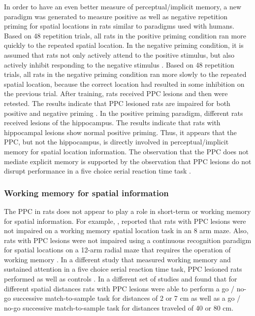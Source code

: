 \documentclass[doc, longtable]{apa6}
\begin{document}
In order to have an even better measure of perceptual/implicit memory, a new paradigm was generated to measure positive as well as negative repetition priming for spatial locations in rats similar to paradigms used with humans. Based on 48 repetition trials, all rats in the positive priming condition ran more quickly to the repeated spatial location. In the negative priming condition, it is assumed that rats not only actively attend to the positive stimulus, but also actively inhibit responding to the negative stimulus \parencite{Neill}. Based on 48 repetition trials, all rats in the negative priming condition ran more slowly to the repeated spatial location, because the correct location had resulted in some inhibition on the previous trial. After training, rats received PPC lesions and then were retested. The results indicate that PPC lesioned rats are impaired for both positive and negative priming \parencite{Kesner2000c}. In the positive priming paradigm, different rats received lesions of the hippocampus. The results indicate that rats with hippocampal lesions show normal positive priming. Thus, it appears that the PPC, but not the hippocampus, is directly involved in perceptual/implicit memory for spatial location information. The observation that the PPC does not mediate explicit memory is supported by the observation that PPC lesions do not disrupt performance in a five choice serial reaction time task \parencite{Muir1996a}.

\subsubsection{Working memory for spatial information}
The PPC in rats does not appear to play a role in short-term or working memory for spatial information. For example, \textcite{Kolb1994a}, reported that rats with PPC lesions were not impaired on a working memory spatial location task in an 8 arm maze. Also, rats with PPC lesions were not impaired using a continuous recognition paradigm for spatial locations on a 12-arm radial maze that requires the operation of working memory \parencite{Chiba2002b}. In a different study that measured working memory and sustained attention in a five choice serial reaction time task, PPC lesioned rats performed as well as controls \parencite{Muir1996a}. In a different set of studies \textcite{Long1996a} and \textcite{Long1998b} found that for different spatial distances rats with PPC lesions were able to perform a go / no-go successive match-to-sample task for distances of 2 or 7 cm as well as a go / no-go successive match-to-sample task for distances traveled of 40 or 80 cm. 
	
\end{document}
